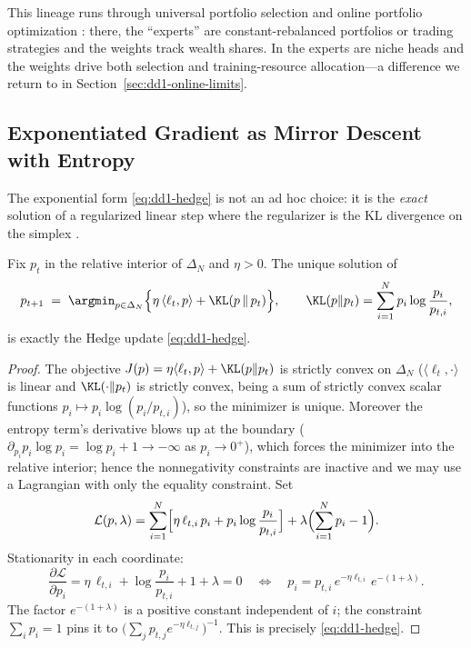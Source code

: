 This lineage runs through universal portfolio selection
\cite{cover1991universal} and online portfolio optimization
\cite{li2014online}: there, the ``experts'' are constant-rebalanced
portfolios or trading strategies and the weights track wealth shares. In
\nm{} the experts are niche heads and the weights drive both selection and
training-resource allocation---a difference we return to in
Section~\ref{sec:dd1-online-limits}.

\subsection{Exponentiated Gradient as Mirror Descent with Entropy}

The exponential form \eqref{eq:dd1-hedge} is not an ad hoc choice: it is the
\emph{exact} solution of a regularized linear step where the regularizer is
the KL divergence on the simplex \cite{kivinen1997exponentiated}.

\begin{proposition}
\label{prop:dd1-eg-mirror}
Fix $p_t$ in the relative interior of $\Delta_N$ and $\eta > 0$. The unique
solution of
\begin{equation}
\label{eq:dd1-mirror-step}
p_{t+1} \;=\; \argmin_{p \in \Delta_N}
\Bigl\{ \eta\, \langle \ell_t, p \rangle + \KL(p \,\|\, p_t) \Bigr\},
\qquad
\KL(p \| p_t) = \sum_{i=1}^N p_i \log \frac{p_i}{p_{t,i}},
\end{equation}
is exactly the Hedge update \eqref{eq:dd1-hedge}.
\end{proposition}

\begin{proof}
The objective $J(p) = \eta \langle \ell_t, p\rangle + \KL(p\|p_t)$ is
strictly convex on $\Delta_N$ ($\langle \ell_t, \cdot\rangle$ is linear and
$\KL(\cdot \| p_t)$ is strictly convex, being a sum of strictly convex scalar
functions $p_i \mapsto p_i \log(p_i / p_{t,i})$), so the minimizer is unique.
Moreover the entropy term's derivative blows up at the boundary
($\partial_{p_i} p_i \log p_i = \log p_i + 1 \to -\infty$ as $p_i \to 0^+$),
which forces the minimizer into the relative interior; hence the
nonnegativity constraints are inactive and we may use a Lagrangian with only
the equality constraint. Set
\[
\mathcal{L}(p, \lambda)
= \sum_{i=1}^N \Bigl[ \eta\, \ell_{t,i}\, p_i
+ p_i \log \frac{p_i}{p_{t,i}} \Bigr]
+ \lambda \Bigl( \sum_{i=1}^N p_i - 1 \Bigr).
\]
Stationarity in each coordinate:
\[
\frac{\partial \mathcal{L}}{\partial p_i}
= \eta\, \ell_{t,i} + \log \frac{p_i}{p_{t,i}} + 1 + \lambda = 0
\quad\Longleftrightarrow\quad
p_i = p_{t,i}\, e^{-\eta \ell_{t,i}}\, e^{-(1 + \lambda)} .
\]
The factor $e^{-(1+\lambda)}$ is a positive constant independent of $i$;
the constraint $\sum_i p_i = 1$ pins it to
$\bigl(\sum_j p_{t,j} e^{-\eta \ell_{t,j}}\bigr)^{-1}$. This is precisely
\eqref{eq:dd1-hedge}.
\end{proof}

